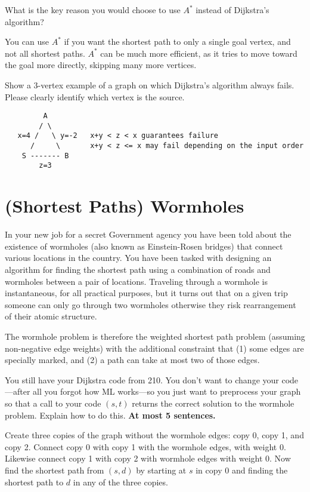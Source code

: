 \begin{problem}[4.]

\ask
What is the key reason you would choose to use $A^*$ instead of
Dijkstra's algorithm?

\sol
You can use $A^*$ if you want the shortest path to only a single goal vertex,
and not all shortest paths. $A^*$ can be much more efficient, as it tries to
move toward the goal more directly, skipping many more vertices.
\end{problem}

\begin{problem}[5.]
\ask
Show a $3$-vertex example of a graph on which Dijkstra's algorithm always
fails. Please clearly identify which vertex is the source.

\sol
\begin{verbatim}
         A 
        / \
   x=4 /   \ y=-2   x+y < z < x guarantees failure
      /     \       x+y < z <= x may fail depending on the input order
    S ------- B
        z=3
\end{verbatim}
\end{problem}


\section{(Shortest Paths) Wormholes}

%



In your new job for a secret Government agency you have been told
about the existence of wormholes (also known as Einstein-Rosen
bridges) that connect various locations in the country.  You have been
tasked with designing an algorithm for finding the shortest path using
a combination of roads and wormholes between a pair of locations.
Traveling through a wormhole is instantaneous, for all practical
purposes, but it turns out that on a given trip someone can only go
through two wormholes otherwise they risk rearrangement of their
atomic structure.

\begin{problem}
The wormhole problem is therefore the weighted shortest path problem
(assuming non-negative edge weights) with the additional constraint
that (1) some edges are specially marked, and (2) a path can take at
most two of those edges.

\ask
You still have your Dijkstra code from 210.  You don't want to change
your code---after all you forgot how ML works---so you just want to
preprocess your graph so that a call to your code \sml{SP}$(s,t)$
returns the correct solution to the wormhole problem.  Explain how to
do this. \textbf{At most 5 sentences.}

\sol
Create three copies of the graph without the wormhole edges: copy 0,
copy 1, and copy 2.  Connect copy 0 with copy 1 with the wormhole
edges, with weight 0.  Likewise connect copy 1 with copy 2 with
wormhole edges with weight 0.  Now find the shortest path from
$(s,d)$ by starting at $s$ in copy 0 and finding the shortest
path to $d$ in any of the three copies.
\end{problem}



